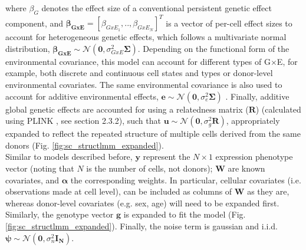 where $\beta_G$ denotes the effect size of a conventional persistent genetic effect component, and $\boldsymbol{\beta_{GxE}}=[\beta_{GxE_1}, .. ,\beta_{GxE_N}]^T$ is a vector of per-cell effect sizes to account for heterogeneous genetic effects, which follows a multivariate normal distribution, 
$\boldsymbol{\beta_{GxE}} \sim \mathcal{N}(\mathbf{0},\sigma_{GxE}^2 \boldsymbol{\Sigma})$. 
Depending on the functional form of the environmental covariance, this model can account for different types of G$\times$E, for example, both discrete and continuous cell states and types or donor-level environmental covariates. 
The same environmental covariance is also used to account for additive environmental effects, 
$\mathbf{e} \sim \mathcal{N}(\mathbf{0},\sigma_e^2 \boldsymbol{\Sigma})$ 
\cite{moore2019linear}. 
Finally, additive global genetic effects are accounted for using a relatedness matrix ($\mathbf{R}$) (calculated using PLINK \cite{purcell2007plink}, see section 
2.3.2), such that
$\mathbf{u} \sim \mathcal{N}(\mathbf{0},\sigma_g^2 \mathbf{R})$,
appropriately expanded to reflect the repeated structure of multiple cells derived from the same donors (Fig. \ref{fig:sc_structlmm_expanded}). \\

Similar to models described before, $\mathbf{y}$ represent the $N \times 1$ expression phenotype vector (noting that $N$ is the number of cells, not donors); $\mathbf{W}$ are known covariates, and $\boldsymbol{\alpha}$ the corresponding weights.
In particular, cellular covariates (i.e. observations made at cell level), can be included as columns of $\mathbf{W}$ as they are, whereas donor-level covariates (e.g. sex, age) will need to be expanded first.
Similarly, the genotype vector $\mathbf{g}$ is expanded to fit the model (Fig. \ref{fig:sc_structlmm_expanded}).
Finally, the noise term is gaussian and i.i.d. $\boldsymbol{\psi} \sim \mathcal{N}(\mathbf{0},\sigma_n^2 \mathbf{I_N})$.\\

